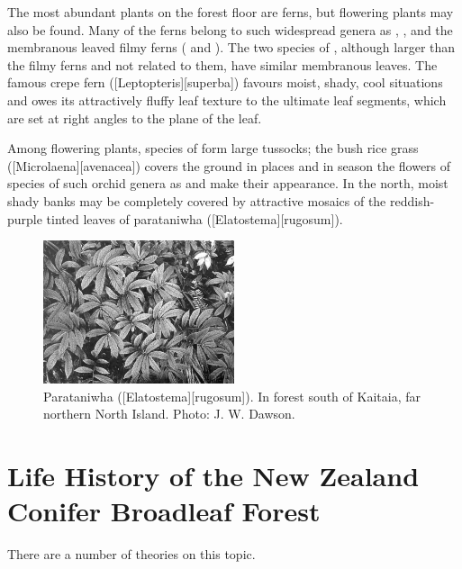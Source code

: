 The most abundant plants on the forest floor are ferns, but flowering plants may also be found.
Many of the ferns belong to such widespread genera as , ,  and the membranous leaved filmy ferns ( and ).
The two species of , although larger than the filmy ferns and not related to them, have similar membranous leaves.
The famous crepe fern ([Leptopteris][superba]) favours moist, shady, cool situations and owes its attractively fluffy leaf texture to the ultimate leaf segments, which are set at right angles to the plane of the leaf.

Among flowering plants, species of  form large tussocks; the bush rice grass ([Microlaena][avenacea]) covers the ground in places and in season the flowers of species of such orchid genera as  and  make their appearance.
In the north, moist shady banks may be completely covered by attractive mosaics of the reddish-purple tinted leaves of parataniwha ([Elatostema][rugosum]).

\begin{figure}
	\includegraphics[width=0.5\textwidth]{graphics/figure63parataniwha.jpg}
	\centering
	\caption[Parataniwha]{Parataniwha ([Elatostema][rugosum]).
In forest south of Kaitaia, far northern North Island.
	Photo: J. W. Dawson.}%
	\label{fig:63parataniwha}
\end{figure}

\section{Life History of the New Zealand Conifer Broadleaf Forest}

There are a number of theories on this topic.

